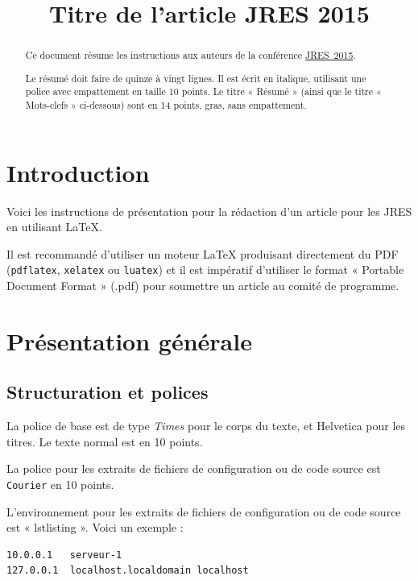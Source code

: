 \documentclass[city=Montpellier,year=2015]{jres}
\title{Titre de l'article JRES 2015}
\begin{document}
\maketitle

\begin{abstract}
Ce document résume les instructions aux auteurs de la conférence
\href{http://www.jres.org}{JRES~2015}.

Le résumé doit faire de quinze à vingt lignes. Il est écrit en italique,
utilisant une police avec empattement en taille 10 points.
Le titre « Résumé » (ainsi que le titre « Mots-clefs » ci-dessous)
sont en 14 points, gras, sans empattement.
\end{abstract}


\section{Introduction}

Voici les instructions de présentation pour la rédaction d'un article
pour les JRES en utilisant \LaTeX{}.

Il est recommandé d'utiliser un moteur \LaTeX{} produisant directement
du PDF (\texttt{pdflatex}, \texttt{xelatex} ou \texttt{luatex}) et il est
impératif d'utiliser le format « Portable Document Format » (.pdf) pour
soumettre un article au comité de programme.


\section{Présentation générale}

\subsection{Structuration et polices}

La police de base est de type \emph{Times} pour le corps du texte, et
\textsf{Helvetica} pour les titres.
Le texte  normal est en 10 points.

La police pour les extraits de fichiers de configuration ou de code
source est \texttt{Courier} en 10 points.

L'environnement pour les extraits de fichiers de configuration ou
de code source  est « lstlisting ». Voici un exemple :
\vspace{2ex}
\begin{lstlisting}
10.0.0.1   serveur-1
127.0.0.1  localhost.localdomain localhost
\end{lstlisting}
\end{document}
